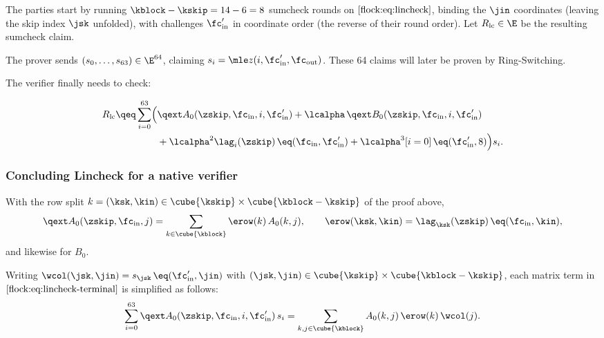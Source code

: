 \vspace{2mm}

The parties start by running $\kblock - \kskip = 14 - 6 = 8$ sumcheck rounds on $\eqref{flock:eq:lincheck}$, binding the $\jin$ coordinates (leaving the skip index $\jsk$ unfolded), with challenges $\fc'_{\mathrm{in}}$ in coordinate order (the reverse of their round order). Let $R_{\mathrm{lc}}\in\E$ be the resulting sumcheck claim.

The prover sends $(s_0,\ldots,s_{63})\in\E^{64}$, claiming $s_i=\mle z(i,\fc'_{\mathrm{in}},\fc_{\mathrm{out}})$. These 64 claims will later be proven by Ring-Switching.

The verifier finally needs to check:

\begin{equation}\label{flock:eq:lincheck-terminal}
\begin{split}
R_{\mathrm{lc}}\qeq\sum_{i=0}^{63}\Bigl(&\qext A_0(\zskip,\fc_{\mathrm{in}},i,\fc'_{\mathrm{in}})+\lcalpha\,\qext B_0(\zskip,\fc_{\mathrm{in}},i,\fc'_{\mathrm{in}})\\
&+\lcalpha^2\lag_i(\zskip)\,\eq(\fc_{\mathrm{in}},\fc'_{\mathrm{in}})+\lcalpha^3[i=0]\,\eq(\fc'_{\mathrm{in}},8)\Bigr)s_i.
\end{split}
\end{equation}

\subsubsection{Concluding Lincheck for a native verifier}\label{flock:native}


With the row split $k=(\ksk,\kin) \in\cube{\kskip} \times \cube{\kblock-\kskip}$ of the proof above,
\begin{equation}\label{flock:eq:erow}
\qext A_0(\zskip,\fc_{\mathrm{in}},j)=\sum_{k\in\cube{\kblock}}\erow(k)\,A_0(k,j),\qquad
\erow(\ksk,\kin)=\lag_{\ksk}(\zskip)\,\eq(\fc_{\mathrm{in}},\kin),
\end{equation}
and likewise for $B_0$.

Writing $\wcol(\jsk,\jin)=s_{\jsk}\,\eq(\fc'_{\mathrm{in}},\jin)$ with $(\jsk,\jin) \in\cube{\kskip} \times \cube{\kblock-\kskip}$, each matrix term in $\eqref{flock:eq:lincheck-terminal}$ is simplified as follows:
\begin{equation}\label{flock:eq:matrix-form}
\sum_{i=0}^{63}\qext A_0(\zskip,\fc_{\mathrm{in}},i,\fc'_{\mathrm{in}})\,s_i=\sum_{k,j\in\cube{\kblock}}A_0(k,j)\,\erow(k)\,\wcol(j).
\end{equation}

